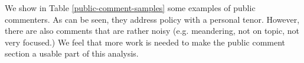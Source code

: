 \documentclass[11pt]{article}
\begin{document}
We show in Table \ref{public-comment-samples} some examples of public commenters. As can be seen, they address policy with a personal tenor. However, there are also comments that are rather noisy (e.g. meandering, not on topic, not very focused.) We feel that more work is needed to make the public comment section a usable part of this analysis.
\end{document}

